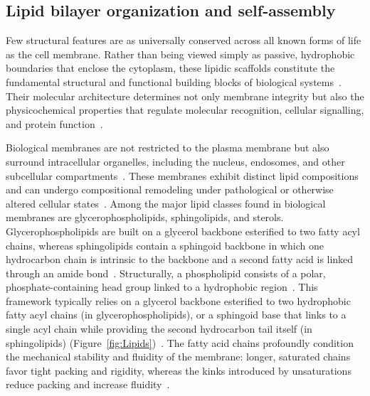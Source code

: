 \subsection{Lipid bilayer organization and self-assembly}

Few structural features are as universally conserved across all known forms of life as the cell membrane. Rather than being viewed simply as passive, hydrophobic boundaries that enclose the cytoplasm, these lipidic scaffolds constitute the fundamental structural and functional building blocks of biological systems~\cite{gould2018membranes}. Their molecular architecture determines not only membrane integrity but also the physicochemical properties that regulate molecular recognition, cellular signalling, and protein function~\cite{lipidomics_1}.

Biological membranes are not restricted to the plasma membrane but also surround intracellular organelles, including the nucleus, endosomes, and other subcellular compartments~\cite{sarmento2023expanding}. These membranes exhibit distinct lipid compositions and can undergo compositional remodeling under pathological or otherwise altered cellular states~\cite{clinbioenerg2020009,kopecka2020phospholipids}. Among the major lipid classes found in biological membranes are glycerophospholipids, sphingolipids, and sterols. Glycerophospholipids are built on a glycerol backbone esterified to two fatty acyl chains, whereas sphingolipids contain a sphingoid backbone in which one hydrocarbon chain is intrinsic to the backbone and a second fatty acid is linked through an amide bond~\cite{fosfolipidos_abundantes}. Structurally, a phospholipid consists of a polar, phosphate-containing head group linked to a hydrophobic region~\cite{fosfolipids}. This framework typically relies on a glycerol backbone esterified to two hydrophobic fatty acyl chains (in glycerophospholipids), or a sphingoid base that links to a single acyl chain while providing the second hydrocarbon tail itself (in sphingolipids) (Figure~\ref{fig:Lipids})~\cite{goni2006biophysics,van2008membrane}. The fatty acid chains profoundly condition the mechanical stability and fluidity of the membrane: longer, saturated chains favor tight packing and rigidity, whereas the kinks introduced by unsaturations reduce packing and increase fluidity~\cite{van2008membrane}.
\FloatBarrier

